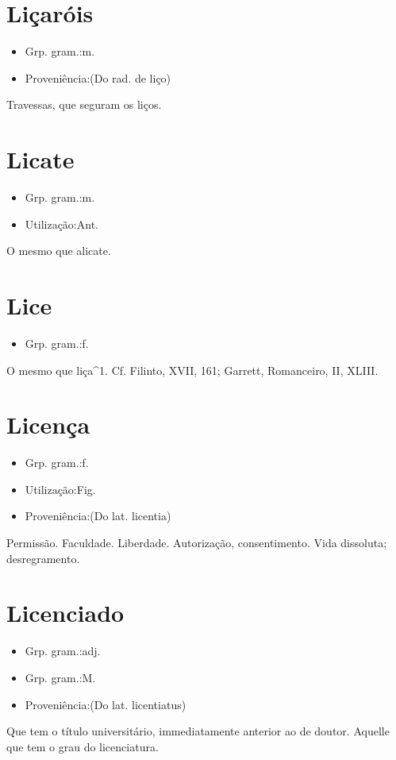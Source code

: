 \section{Liçaróis}
\begin{itemize}
\item {Grp. gram.:m.}
\end{itemize}
\begin{itemize}
\item {Proveniência:(Do rad. de \textunderscore liço\textunderscore )}
\end{itemize}
Travessas, que seguram os liços.
\section{Licate}
\begin{itemize}
\item {Grp. gram.:m.}
\end{itemize}
\begin{itemize}
\item {Utilização:Ant.}
\end{itemize}
O mesmo que \textunderscore alicate\textunderscore .
\section{Lice}
\begin{itemize}
\item {Grp. gram.:f.}
\end{itemize}
O mesmo que \textunderscore liça\textunderscore ^1. Cf. Filinto, XVII, 161; Garrett, \textunderscore Romanceiro\textunderscore , II, XLIII.
\section{Licença}
\begin{itemize}
\item {Grp. gram.:f.}
\end{itemize}
\begin{itemize}
\item {Utilização:Fig.}
\end{itemize}
\begin{itemize}
\item {Proveniência:(Do lat. \textunderscore licentia\textunderscore )}
\end{itemize}
Permissão.
Faculdade.
Liberdade.
Autorização, consentimento.
Vida dissoluta; desregramento.
\section{Licenciado}
\begin{itemize}
\item {Grp. gram.:adj.}
\end{itemize}
\begin{itemize}
\item {Grp. gram.:M.}
\end{itemize}
\begin{itemize}
\item {Proveniência:(Do lat. \textunderscore licentiatus\textunderscore )}
\end{itemize}
Que tem o título universitário, immediatamente anterior ao de doutor.
Aquelle que tem o grau do licenciatura.
